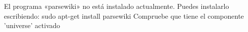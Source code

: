El programa «parsewiki» no está instalado actualmente.  Puedes instalarlo escribiendo:
sudo apt-get install parsewiki
Compruebe que tiene el componente 'universe' activado
